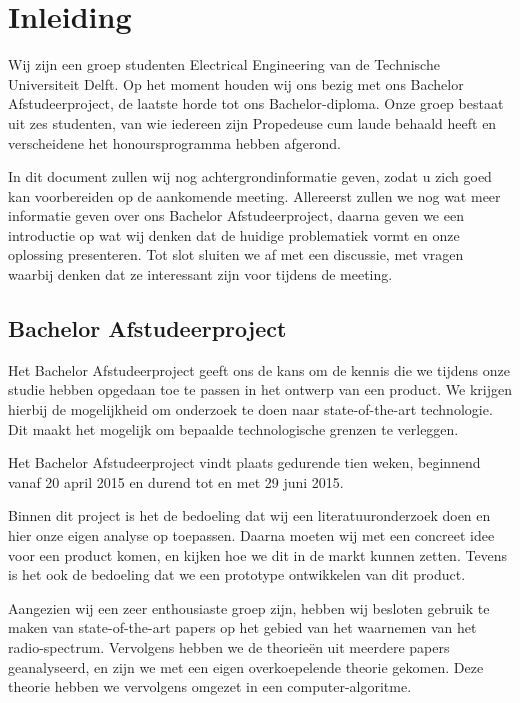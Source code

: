 \documentclass[oneside, a4paper, openany]{memoir}
\begin{document}


\frontmatter
\setcounter{page}{5}
\begin{titlingpage}
  \pagestyle{empty}
  \titleGM
\end{titlingpage}

\tableofcontents

\clearpage
\mainmatter

\chapter{Inleiding}
Wij zijn een groep studenten Electrical Engineering van de Technische Universiteit Delft. Op het moment houden wij ons bezig met ons Bachelor Afstudeerproject, de laatste horde tot ons Bachelor-diploma. Onze groep bestaat uit zes studenten, van wie iedereen zijn Propedeuse cum laude behaald heeft en verscheidene het honoursprogramma hebben afgerond.

In dit document zullen wij nog achtergrondinformatie geven, zodat u zich goed kan voorbereiden op de aankomende meeting. Allereerst zullen we nog wat meer informatie geven over ons Bachelor Afstudeerproject, daarna geven we een introductie op wat wij denken dat de huidige problematiek vormt en onze oplossing presenteren. Tot slot sluiten we af met een discussie, met vragen waarbij denken dat ze interessant zijn voor tijdens de meeting.


\section{Bachelor Afstudeerproject}
Het Bachelor Afstudeerproject geeft ons de kans om de kennis die we tijdens onze studie hebben opgedaan toe te passen in het ontwerp van een product. We krijgen hierbij de mogelijkheid om onderzoek te doen naar state-of-the-art technologie. Dit maakt het mogelijk om bepaalde technologische grenzen te verleggen.

Het Bachelor Afstudeerproject vindt plaats gedurende tien weken, beginnend vanaf 20 april 2015 en durend tot en met 29 juni 2015.

Binnen dit project is het de bedoeling dat wij een literatuuronderzoek doen en hier onze eigen analyse op toepassen. Daarna moeten wij met een concreet idee voor een product komen, en kijken hoe we dit in de markt kunnen zetten. Tevens is het ook de bedoeling dat we een prototype ontwikkelen van dit product.

Aangezien wij een zeer enthousiaste groep zijn, hebben wij besloten gebruik te maken van state-of-the-art papers op het gebied van het waarnemen van het radio-spectrum. Vervolgens hebben we de theorieën uit meerdere papers geanalyseerd, en zijn we met een eigen overkoepelende theorie gekomen. Deze theorie hebben we vervolgens omgezet in een computer-algoritme.
\end{document}
